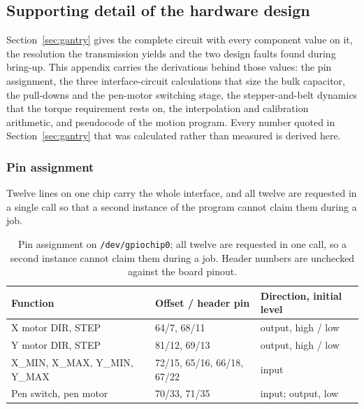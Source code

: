
\subsection{Supporting detail of the hardware design}
\label{sec:app-hw}

Section~\ref{sec:gantry} gives the complete circuit with every component value on it, the resolution the transmission yields and the two design faults found during bring-up.
This appendix carries the derivations behind those values: the pin assignment, the three interface-circuit calculations that size the bulk capacitor, the pull-downs and the pen-motor switching stage, the stepper-and-belt dynamics that the torque requirement rests on, the interpolation and calibration arithmetic, and pseudocode of the motion program.
Every number quoted in Section~\ref{sec:gantry} that was calculated rather than measured is derived here.

\subsubsection{Pin assignment}

Twelve lines on one chip carry the whole interface, and all twelve are requested in a single call so that a second instance of the program cannot claim them during a job.

\begin{table}[!htbp]
\centering
\fontsize{8}{9.2}\selectfont
\setlength{\tabcolsep}{3pt}\renewcommand{\arraystretch}{1.0}
\begin{tabularx}{\linewidth}{|p{3.4cm}|X|p{3.6cm}|}
\hline
\textbf{Function} & \textbf{Offset / header pin} & \textbf{Direction, initial level} \\
\hline
X motor DIR, STEP & 64/7, 68/11 & output, high / low \\
Y motor DIR, STEP & 81/12, 69/13 & output, high / low \\
X\_MIN, X\_MAX, Y\_MIN, Y\_MAX & 72/15, 65/16, 66/18, 67/22 & input \\
Pen switch, pen motor & 70/33, 71/35 & input; output, low \\
\hline
\end{tabularx}
\caption{Pin assignment on \texttt{/dev/gpiochip0}; all twelve are requested in one call, so a second instance cannot claim them during a job. Header numbers are unchecked against the board pinout.}
\label{tab:gan-pins}
\end{table}

